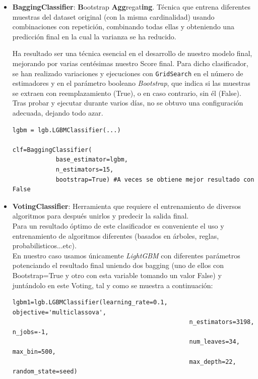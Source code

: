 \begin{itemize}
		\item \textbf{BaggingClassifier}: \textbf{B}ootstrap \textbf{Agg}regat\textbf{ing}. Técnica que entrena diferentes muestras del dataset original (con la misma cardinalidad) usando combinaciones con repetición, combinando todas ellas y obteniendo una predicción final en la cual la varianza se ha reducido. 
		
		Ha resultado ser una técnica esencial en el desarrollo de nuestro modelo final, mejorando por varias centésimas nuestro Score final. Para dicho clasificador, se han realizado variaciones y ejecuciones con \texttt{GridSearch} en el número de estimadores y en el parámetro booleano \textit{Bootstrap}, que indica si las muestras se extraen con reemplazamiento (True), o en caso contrario, sin él (False). Tras probar y ejecutar durante varios días, no se obtuvo una configuración adecuada, dejando todo azar. \\
		
		
		
		\begin{lstlisting}[frame=single]
lgbm = lgb.LGBMClassifier(...)
		
clf=BaggingClassifier(
			base_estimator=lgbm,
			n_estimators=15,
			bootstrap=True) #A veces se obtiene mejor resultado con False
		\end{lstlisting} 
		
		\hfill
		\hfill
		\item \textbf{VotingClassifier}: Herramienta que requiere el entrenamiento de diversos algoritmos para después unirlos y predecir la salida final.  \\
		Para un resultado óptimo de este clasificador es conveniente el uso y entrenamiento de algoritmos diferentes (basados en árboles, reglas, probabilisticos...etc). \\
		
		\newpage
		 En nuestro caso usamos únicamente \textit{LightGBM} con diferentes parámetros potenciando el resultado final uniendo dos bagging (uno de ellos con Bootstrap=True y otro con esta variable tomando un valor False) y juntándolo en este Voting, tal y como se muestra a continuación: \\
		
		
		\begin{lstlisting}[frame=single]
lgbm1=lgb.LGBMClassifier(learning_rate=0.1, objective='multiclassova',
												 n_estimators=3198, n_jobs=-1,
												 num_leaves=34, max_bin=500,
												 max_depth=22, random_state=seed)


\end{lstlisting}
\end{itemize}
